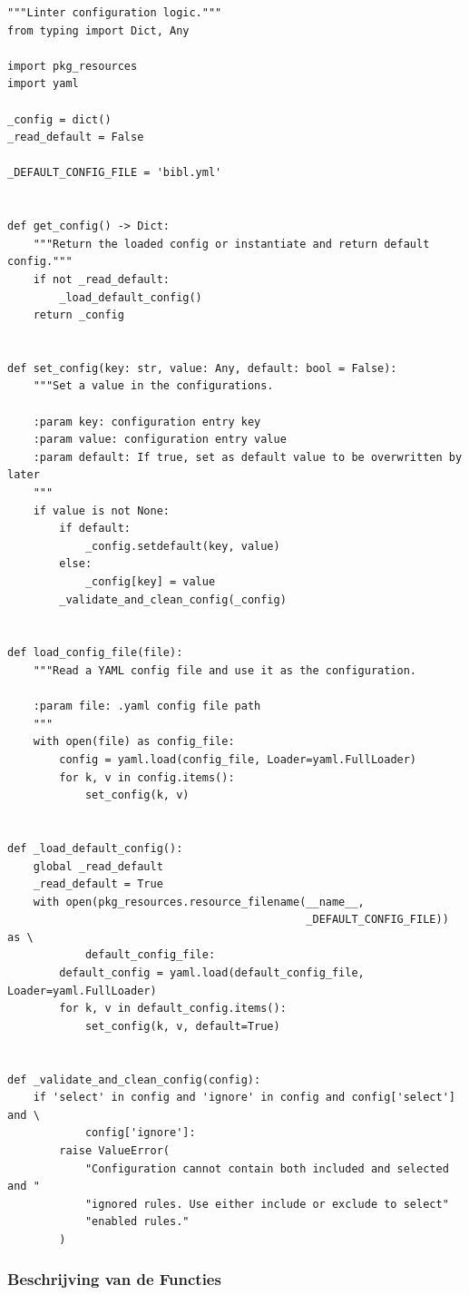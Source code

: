 \begin{verbatim}
"""Linter configuration logic."""
from typing import Dict, Any

import pkg_resources
import yaml

_config = dict()
_read_default = False

_DEFAULT_CONFIG_FILE = 'bibl.yml'


def get_config() -> Dict:
    """Return the loaded config or instantiate and return default config."""
    if not _read_default:
        _load_default_config()
    return _config


def set_config(key: str, value: Any, default: bool = False):
    """Set a value in the configurations.

    :param key: configuration entry key
    :param value: configuration entry value
    :param default: If true, set as default value to be overwritten by later
    """
    if value is not None:
        if default:
            _config.setdefault(key, value)
        else:
            _config[key] = value
        _validate_and_clean_config(_config)


def load_config_file(file):
    """Read a YAML config file and use it as the configuration.

    :param file: .yaml config file path
    """
    with open(file) as config_file:
        config = yaml.load(config_file, Loader=yaml.FullLoader)
        for k, v in config.items():
            set_config(k, v)


def _load_default_config():
    global _read_default
    _read_default = True
    with open(pkg_resources.resource_filename(__name__,
                                              _DEFAULT_CONFIG_FILE)) as \
            default_config_file:
        default_config = yaml.load(default_config_file, Loader=yaml.FullLoader)
        for k, v in default_config.items():
            set_config(k, v, default=True)


def _validate_and_clean_config(config):
    if 'select' in config and 'ignore' in config and config['select'] and \
            config['ignore']:
        raise ValueError(
            "Configuration cannot contain both included and selected and "
            "ignored rules. Use either include or exclude to select"
            "enabled rules."
        )
\end{verbatim}

\subsubsection{Beschrijving van de Functies}

